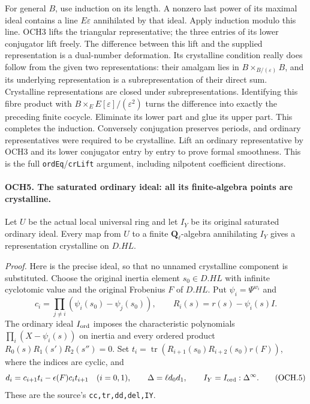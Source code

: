 For general \(B\), use induction on its length.  A nonzero last
power of its maximal ideal contains a line \(E\varepsilon\)
annihilated by that ideal.  Apply induction modulo this line.
OCH3 lifts the triangular representative; the three entries of its
lower conjugator lift freely.  The difference between this lift and
the supplied representation is a dual-number deformation.  Its
crystalline condition really does follow from the given two
representations: their amalgam lies in
\(B\times_{B/(\varepsilon)}B\), and its underlying representation
is a subrepresentation of their direct sum.  Crystalline
representations are closed under subrepresentations.  Identifying
this fibre product with \(B\times_E E[\varepsilon]/(\varepsilon^2)\)
turns the difference into exactly the preceding finite cocycle.
Eliminate its lower part and glue its upper part.  This completes
the induction.  Conversely conjugation preserves periods, and
ordinary representatives were required to be crystalline.
Lift an ordinary representative by OCH3 and its lower conjugator
entry by entry to prove formal smoothness.  This is the full
\texttt{ordEq}/\texttt{crLift} argument, including nilpotent
coefficient directions.

\paragraph{OCH5. The saturated ordinary ideal: all its finite-algebra points are crystalline.}
\label{claim:OCH5}
Let \(U\) be the actual local universal ring and let \(I_Y\)
be its original saturated ordinary ideal.  Every map from
\(U\) to a finite \(\mathbf Q_\ell\)-algebra annihilating
\(I_Y\) gives a representation crystalline on \(D.HL\).

\emph{Proof.}
Here is the precise ideal, so that no unnamed crystalline component
is substituted.  Choose the original inertia element \(s_0\in D.HL\)
with infinite cyclotomic value and the original Frobenius \(F\)
of \(D.HL\).  Put \(\psi_i=\Psi^{w_i}\) and
\[
 c_i=\prod_{j\ne i}(\psi_i(s_0)-\psi_j(s_0)),\qquad
 R_i(s)=r(s)-\psi_i(s)I.
\]
The ordinary ideal \(I_{\rm ord}\) imposes the characteristic
polynomials \(\prod_i(X-\psi_i(s))\) on inertia and every ordered
product \(R_0(s)R_1(s')R_2(s'')=0\).
Set \(t_i=\operatorname{tr}(R_{i+1}(s_0)R_{i+2}(s_0)r(F))\),
where the indices are cyclic, and
\[
 d_i=c_{i+1}t_i-\epsilon(F)c_i t_{i+1}\quad(i=0,1),
 \qquad \Delta=\ell d_0d_1,
 \qquad I_Y=I_{\rm ord}:\Delta^\infty.
 \tag{OCH.5}
\]
These are the source's \texttt{cc,tr,dd,del,IY}.

